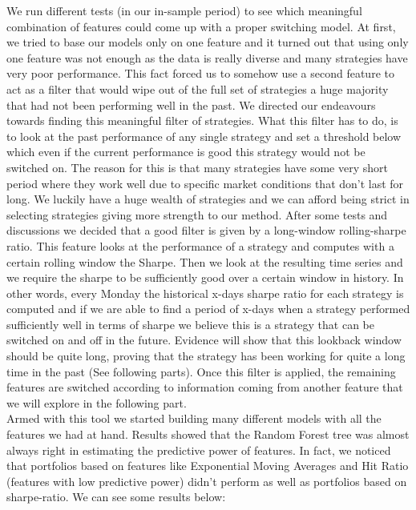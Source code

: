 \documentclass[12pt]{article} %
\numberwithin{equation}{subsection}
\begin{document}
We run different tests (in our in-sample period) to see which meaningful combination of features could come up with a proper switching model. At first, we tried to base our models only on one feature and it turned out that using only one feature was not enough as the data is really diverse and many strategies have very poor performance. This fact forced us to somehow use a second feature to act as a filter that would wipe out of the full set of strategies a huge majority that had not been performing well in the past. We directed our endeavours towards finding this meaningful filter of strategies. What this filter has to do, is to look at the past performance of any single strategy and set a threshold below which even if the current performance is good this strategy would not be switched on. The reason for this is that many strategies have some very short period where they work well due to specific market conditions that don't last for long. We luckily have a huge wealth of strategies and we can afford being strict in selecting strategies giving more strength to our method. After some tests and discussions we decided that a good filter is given by a long-window rolling-sharpe ratio. This feature looks at the performance of a strategy and computes with a certain rolling window the Sharpe. Then we look at the resulting time series and we require the sharpe to be sufficiently good over a certain window in history. In other words, every Monday the historical x-days sharpe ratio for each strategy is computed and if we are able to find  a period of x-days when a strategy performed sufficiently well in terms of sharpe we believe this is a strategy that can be switched on and off in the future. Evidence will show that this lookback window should be quite long, proving that the strategy has been working for quite a long time in the past (See following parts). Once this filter is applied, the remaining features are switched according to information coming from another feature that we will explore in the following part.\\
Armed with this tool we started building many different models with all the features we had at hand. Results showed that the Random Forest tree was almost always right in estimating the predictive power of features. In fact, we noticed that portfolios based on features like Exponential Moving Averages and Hit Ratio (features with low predictive power) didn't perform as well as portfolios based on sharpe-ratio. We can see some results below:

\end{document}
